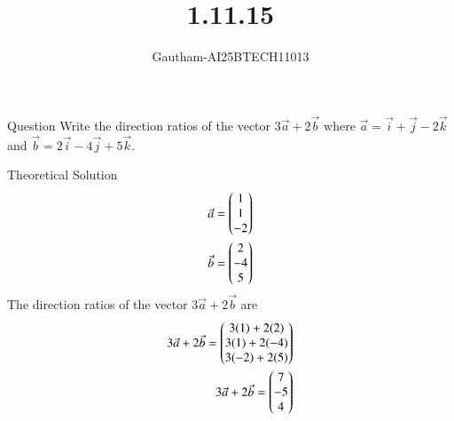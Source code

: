 \documentclass{beamer}
\title %
{1.11.15}
\author %
{Gautham-AI25BTECH11013}
\begin{document}
\frame{\titlepage}
\begin{frame}{Question}
Write the direction ratios of the vector 3$\Vec{a}+2\Vec{b}$ where $\Vec{a}=\overrightarrow{i}+\overrightarrow{j}-2\overrightarrow{k}$ and $\Vec{b}=2\overrightarrow{i}-4\overrightarrow{j}+5\overrightarrow{k}$.
\end{frame}
\begin{frame}{Theoretical Solution}
\begin{align}
\Vec{a}=\begin{pmatrix}1 \\ 1 \\ -2\end{pmatrix} \\
\Vec{b}=\begin{pmatrix}2 \\ -4 \\ 5\end{pmatrix}
\end{align}
The direction ratios of the vector $3\Vec{a}+2\Vec{b}$ are
\begin{align}
    3\Vec{a}+2\Vec{b}=\begin{pmatrix}3(1)+2(2)\\3(1)+2(-4)\\3(-2)+2(5)\end{pmatrix} \\
    3\Vec{a}+2\Vec{b}=\begin{pmatrix}7\\-5\\4\end{pmatrix}
\end{align}
\end{frame}
\end{document}
